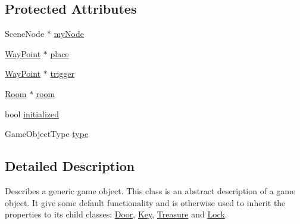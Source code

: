 \subsection*{\-Protected \-Attributes}
\begin{DoxyCompactItemize}
\item 
\-Scene\-Node $\ast$ \hyperlink{classGameObject_a44fbbf424125cebcb1e9a071946b6567}{my\-Node}
\item 
\hyperlink{classWayPoint}{\-Way\-Point} $\ast$ \hyperlink{classGameObject_ae8983dfdcfe7bcd2e81fe20a674bb3e6}{place}
\item 
\hyperlink{classWayPoint}{\-Way\-Point} $\ast$ \hyperlink{classGameObject_ace2db5f1940d0489b8766a77f0832069}{trigger}
\item 
\hyperlink{classRoom}{\-Room} $\ast$ \hyperlink{classGameObject_a9f63419cc03f2513f757a317a2e37557}{room}
\item 
bool \hyperlink{classGameObject_af98cecb661e1ffaa19d0d92041020319}{initialized}
\item 
\-Game\-Object\-Type \hyperlink{classGameObject_a6f5c85c8b3a4cb373efb1faa229fc9f3}{type}
\end{DoxyCompactItemize}


\subsection{\-Detailed \-Description}
\-Describes a generic game object. \-This class is an abstract description of a game object. \-It give some default functionality and is otherwise used to inherit the properties to its child classes\-: \hyperlink{classDoor}{\-Door}, \hyperlink{classKey}{\-Key}, \hyperlink{classTreasure}{\-Treasure} and \hyperlink{classLock}{\-Lock}. 


